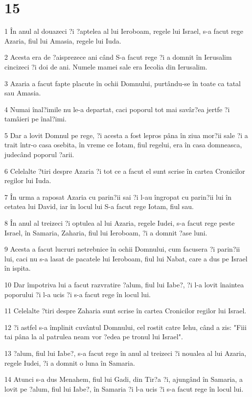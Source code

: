 \chapter{15}

\par 1 În anul al douazeci ?i ?aptelea al lui Ieroboam, regele lui Israel, s-a facut rege Azaria, fiul lui Amasia, regele lui Iuda.
\par 2 Acesta era de ?aisprezece ani când S-a facut rege ?i a domnit în Ierusalim cincizeci ?i doi de ani. Numele mamei sale era Iecolia din Ierusalim.
\par 3 Azaria a facut fapte placute în ochii Domnului, purtându-se în toate ca tatal sau Amasia.
\par 4 Numai înal?imile nu le-a departat, caci poporul tot mai savâr?ea jertfe ?i tamâieri pe înal?imi.
\par 5 Dar a lovit Domnul pe rege, ?i acesta a fost lepros pâna în ziua mor?ii sale ?i a trait într-o casa osebita, în vreme ce Iotam, fiul regelui, era în casa domneasca, judecând poporul ?arii.
\par 6 Celelalte ?tiri despre Azaria ?i tot ce a facut el sunt scrise în cartea Cronicilor regilor lui Iuda.
\par 7 În urma a raposat Azaria cu parin?ii sai ?i l-au îngropat cu parin?ii lui în cetatea lui David, iar în locul lui S-a facut rege Iotam, fiul sau.
\par 8 În anul al treizeci ?i optulea al lui Azaria, regele Iudei, s-a facut rege peste Israel, în Samaria, Zaharia, fiul lui Ieroboam, ?i a domnit ?ase luni.
\par 9 Acesta a facut lucruri netrebnice în ochii Domnului, cum facusera ?i parin?ii lui, caci nu s-a lasat de pacatele lui Ieroboam, fiul lui Nabat, care a dus pe Israel în ispita.
\par 10 Dar împotriva lui a facut razvratire ?alum, fiul lui Iabe?, ?i l-a lovit înaintea poporului ?i l-a ucis ?i s-a facut rege în locul lui.
\par 11 Celelalte ?tiri despre Zaharia sunt scrise în cartea Cronicilor regilor lui Israel.
\par 12 ?i astfel s-a împlinit cuvântul Domnului, cel rostit catre Iehu, când a zis: "Fiii tai pâna la al patrulea neam vor ?edea pe tronul lui Israel".
\par 13 ?alum, fiul lui Iabe?, s-a facut rege în anul al treizeci ?i noualea al lui Azaria, regele Iudei, ?i a domnit o luna în Samaria.
\par 14 Atunci s-a dus Menahem, fiul lui Gadi, din Tir?a ?i, ajungând în Samaria, a lovit pe ?alum, fiul lui Iabe?, în Samaria ?i l-a ucis ?i s-a facut rege în locul lui.

